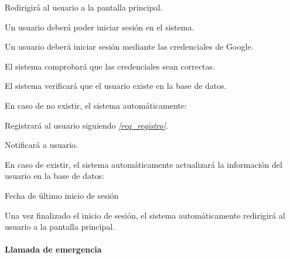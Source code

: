 \begin{myEnumerate}
\begin{myEnumerate}
\begin{myEnumerate}
    	\item Redirigirá al usuario a la pantalla principal.
    	\end{myEnumerate}
  \end{myEnumerate}
  
  \item Un usuario deberá poder iniciar sesión en el sistema. %
    \begin{myEnumerate}%
      \item Un usuario deberá iniciar sesión mediante las credenciales de Google.
      \begin{myEnumerate}%
      	\item El sistema comprobará que las credenciales sean correctas.
      	\item El sistema verificará que el usuario existe en la base de datos.
      		\begin{myEnumerate}%
      			\item En caso de no existir, el sistema automáticamente:
      			\begin{myEnumerate}%
      				\item Registrará al usuario siguiendo \textit{\ref{req_registro}}.
      				\item Notificará a usuario.
      			\end{myEnumerate}
      			\item En caso de existir, el sistema automáticamente actualizará la información del usuario en la base de datos:
      			\begin{myEnumerate}
      				\item Fecha de último inicio de sesión
      			\end{myEnumerate}
      		\end{myEnumerate}
      \end{myEnumerate}
      
      \item Una vez finalizado el inicio de sesión, el sistema automáticamente redirigirá al usuario a la pantalla principal.
    \end{myEnumerate}
\end{myEnumerate}

\paragraph*{Llamada de emergencia}

